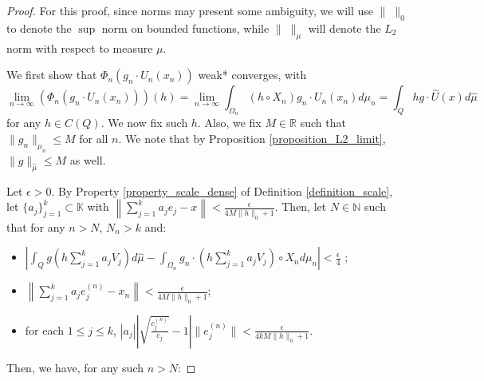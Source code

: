 \documentclass[10pt,a4paper]{amsart}
\def \HMU{\hat{\mu}}
\def \HU{\hat{U}}
\begin{document}
\begin{proof}
	For this proof, since norms may present some ambiguity, we will use $\|\; \|_0$ to denote the $\sup$ norm on bounded functions, while $\|\; \|_{\mu}$ will denote the $L_2$ norm with respect to measure $\mu$.
	
	We first show that $\Phi_n(g_n\cdot U_n(x_n))$ weak* converges, with $$\lim_{n\rightarrow\infty} (\Phi_n(g_n\cdot U_n(x_n)))(h)=\lim_{n\rightarrow\infty}\int_{\Omega_n} (h\circ X_n)g_n\cdot U_n(x_n)d\mu_n=\int_{Q}hg\cdot\HU(x)d\HMU$$ for any $h\in C(Q)$. We now fix such $h$. Also, we fix $M\in\mathbb{R}$ such that $\|g_n\|_{\mu_n}\leq M$ for all $n$. We note that by Proposition \ref{proposition_L2_limit}, $\|g\|_{\HMU}\leq M$ as well.
	
	Let $\epsilon>0$.  By Property \ref{property_scale_dense} of Definition \ref{definition_scale}, let $\{a_j \}_{j=1}^k\subset\mathbb{K}$ with  $\left\|\sum_{j=1}^ka_je_j-x \right\|<\frac{\epsilon}{4M\|h\|_0+1}$. Then, let $N\in\mathbb{N}$ such that for any $n>N$, $N_n>k$ and:
	\begin{itemize}
		\item $\left|\int_{Q}g\left(h\sum_{j=1}^ka_jV_j\right)d\HMU-\int_{\Omega_n}g_n\cdot\left(h\sum_{j=1}^ka_jV_j\right)\circ X_nd\mu_n \right|<\frac{\epsilon}{4}$ ;
		\item $\left\|\sum_{j=1}^ka_je_j^{(n)}-x_n \right\|<\frac{\epsilon}{4M\|h\|_0+1}$;
		\item for each $1\leq j\leq k$, $|a_j|\left|\sqrt{\frac{c_j^{(n)}}{c_j}}-1\right|\|e_j^{(n)}\|<\frac{\epsilon}{4kM\|h\|_0+1}$.
	\end{itemize}
	Then, we have, for any such $n>N$:
	

\end{proof}
\end{document}
